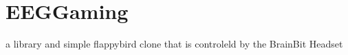 \chapter{EEGGaming}
\hypertarget{md__d_1_2_cloud_01_folder_2_one_drive_2_my_01_programs_2_post-_graduate_2_master_01in_01_informa347b846a482b3a14cd81b7dec75d443c}{}\label{md__d_1_2_cloud_01_folder_2_one_drive_2_my_01_programs_2_post-_graduate_2_master_01in_01_informa347b846a482b3a14cd81b7dec75d443c}
\label{md__d_1_2_cloud_01_folder_2_one_drive_2_my_01_programs_2_post-_graduate_2_master_01in_01_informa347b846a482b3a14cd81b7dec75d443c_autotoc_md0}%
%


a library and simple flappybird clone that is controleld by the Brain\+Bit Headset 
